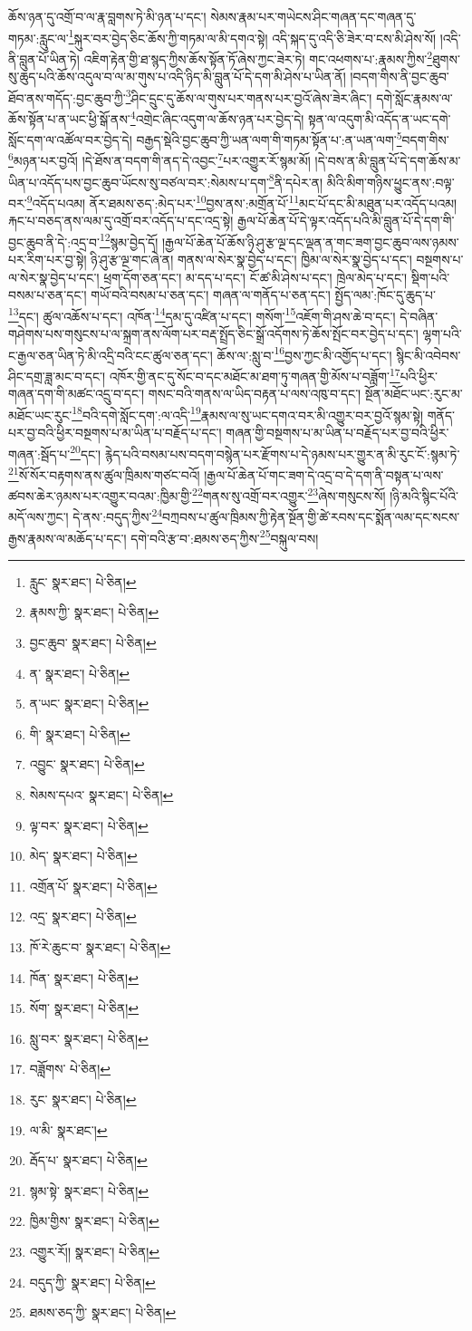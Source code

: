 ཆོས་ཉན་དུ་འགྲོ་བ་ལ་རྣ་བླགས་ཏེ་མི་ཉན་པ་དང་། སེམས་རྣམ་པར་གཡེངས་ཤིང་གཞན་དང་གཞན་དུ་གཏམ་:རླུང་ལ་\footnote{རླུང་  སྣར་ཐང་།  པེ་ཅིན། }སྐུར་བར་བྱེད་ཅིང་ཆོས་ཀྱི་གཏམ་ལ་མི་དགའ་སྟེ། འདི་སྐད་དུ་འདི་ཅི་ཟེར་བ་ངས་མི་ཤེས་སོ། །འདི་ནི་བླུན་པོ་ཡིན་ཏེ། འཇིག་རྟེན་གྱི་ཐ་སྙད་ཀྱིས་ཆོས་སྟོན་ཏོ་ཞེས་ཀྱང་ཟེར་ཏེ། གང་འཕགས་པ་:རྣམས་ཀྱིས་\footnote{རྣམས་ཀྱི་  སྣར་ཐང་།  པེ་ཅིན། }ཐུགས་སུ་ཆུད་པའི་ཆོས་འདུལ་བ་ལ་མ་གུས་པ་འདི་ཉིད་མི་བླུན་པོ་དེ་དག་མི་ཤེས་པ་ཡིན་ནོ། །བདག་གིས་ནི་བྱང་ཆུབ་ཐོབ་ནས་གདོད་:བྱང་ཆུབ་ཀྱི་\footnote{བྱང་ཆུབ་  སྣར་ཐང་།  པེ་ཅིན། }ཤིང་དྲུང་དུ་ཆོས་ལ་གུས་པར་གནས་པར་བྱའོ་ཞེས་ཟེར་ཞིང་། དགེ་སློང་རྣམས་ལ་ཆོས་སྟོན་པ་ན་ཡང་ཕྱི་སྒོ་ནས་\footnote{ན་  སྣར་ཐང་།  པེ་ཅིན། }འགྲེང་ཞིང་འདུག་ལ་ཆོས་ཉན་པར་བྱེད་དེ། སྟན་ལ་འདུག་མི་འདོད་ན་ཡང་དགེ་སློང་དག་ལ་འཚོལ་བར་བྱེད་དེ། བརྒྱད་སྡེའི་བྱང་ཆུབ་ཀྱི་ཡན་ལག་གི་གཏམ་སྟོན་པ་:ན་ཡན་ལག་\footnote{ན་ཡང་  སྣར་ཐང་།  པེ་ཅིན། }བདག་གིས་\footnote{གི་  སྣར་ཐང་།  པེ་ཅིན། }མཉན་པར་བྱའོ། །དེ་ཐོས་ན་བདག་གི་ནད་དེ་འབྱང་\footnote{འབྱུང་  སྣར་ཐང་།  པེ་ཅིན། }པར་འགྱུར་རོ་སྙམ་མོ། །དེ་བས་ན་མི་བླུན་པོ་དེ་དག་ཆོས་མ་ཡིན་པ་འདོད་པས་བྱང་ཆུབ་ཡོངས་སུ་བཙལ་བར་:སེམས་པ་དག་\footnote{སེམས་དཔའ་  སྣར་ཐང་།  པེ་ཅིན། }ནི་དཔེར་ན། མིའི་མིག་གཉིས་ཕྱུང་ནས་:བལྟ་བར་\footnote{ལྟ་བར་  སྣར་ཐང་།  པེ་ཅིན། }འདོད་པའམ། ནོར་ཐམས་ཅད་:མེད་པར་\footnote{མེད་  སྣར་ཐང་།  པེ་ཅིན། }བྱས་ནས་:མགྲོན་པོ་\footnote{འགྲོན་པོ་  སྣར་ཐང་།  པེ་ཅིན། }མང་པོ་དང་མི་མཐུན་པར་འདོད་པའམ། རྐང་པ་བཅད་ནས་ལམ་དུ་འགྲོ་བར་འདོད་པ་དང་འདྲ་སྟེ། རྒྱལ་པོ་ཆེན་པོ་དེ་ལྟར་འདོད་པའི་མི་བླུན་པོ་དེ་དག་གི་བྱང་ཆུབ་ནི་དེ་:འདྲ་བ་\footnote{འདྲ་  སྣར་ཐང་།  པེ་ཅིན། }སྙམ་བྱེད་དོ། །རྒྱལ་པོ་ཆེན་པོ་ཆོས་ཉི་ཤུ་རྩ་ལྔ་དང་ལྡན་ན་གང་ཟག་བྱང་ཆུབ་ལས་ཉམས་པར་རིག་པར་བྱ་སྟེ། ཉི་ཤུ་རྩ་ལྔ་གང་ཞེ་ན། གནས་ལ་སེར་སྣ་བྱེད་པ་དང་། ཁྱིམ་ལ་སེར་སྣ་བྱེད་པ་དང་། བསྔགས་པ་ལ་སེར་སྣ་བྱེད་པ་དང་། ཕྲག་དོག་ཅན་དང་། མ་དད་པ་དང་། ངོ་ཚ་མི་ཤེས་པ་དང་། ཁྲེལ་མེད་པ་དང་། སྡིག་པའི་བསམ་པ་ཅན་དང་། གཡོ་བའི་བསམ་པ་ཅན་དང་། གཞན་ལ་གནོད་པ་ཅན་དང་། སྤྱོད་ལམ་:ཁོང་དུ་ཆུད་པ་\footnote{ཁོ་རེ་ཆུང་བ་  སྣར་ཐང་།  པེ་ཅིན། }དང་། ཚུལ་འཆོས་པ་དང་། འཁོན་\footnote{ཁོན་  སྣར་ཐང་།  པེ་ཅིན། }དམ་དུ་འཛིན་པ་དང་། གསོག་\footnote{སོག་  སྣར་ཐང་།  པེ་ཅིན། }འཇོག་གི་ཤས་ཆེ་བ་དང་། དེ་བཞིན་གཤེགས་པས་གསུངས་པ་ལ་སྐྲག་ནས་ལོག་པར་བརྡ་སྤྲོད་ཅིང་སྒྲོ་འདོགས་ཏེ་ཆོས་སྤོང་བར་བྱེད་པ་དང་། ལྷག་པའི་ང་རྒྱལ་ཅན་ཡིན་ཏེ་མི་འདྲི་བའི་ངང་ཚུལ་ཅན་དང་། ཆོས་ལ་:སླུ་བ་\footnote{སླུ་བར་  སྣར་ཐང་།  པེ་ཅིན། }བྱས་ཀྱང་མི་འགྱོད་པ་དང་། སྙིང་མི་འབེབས་ཤིང་དགྲ་ཟླ་མང་བ་དང་། འཁོར་གྱི་ནང་དུ་སོང་བ་དང་མཐོང་མ་ཐག་ཏུ་གཞན་གྱི་མོས་པ་བཟློག་\footnote{བཟློགས་  པེ་ཅིན། }པའི་ཕྱིར་གཞན་དག་གི་མཚང་འདྲུ་བ་དང་། གསང་བའི་གནས་ལ་ཡིད་བརྟན་པ་ལས་འཁུ་བ་དང་། སྔོན་མཐོང་ཡང་:རུང་མ་མཐོང་ཡང་རུང་\footnote{རུང་  སྣར་ཐང་།  པེ་ཅིན། }བའི་དགེ་སློང་དག་:ལ་འདི་\footnote{ལ་མི་  སྣར་ཐང་། }རྣམས་ལ་སུ་ཡང་དགའ་བར་མི་འགྱུར་བར་བྱའོ་སྙམ་སྟེ། གནོད་པར་བྱ་བའི་ཕྱིར་བསྔགས་པ་མ་ཡིན་པ་བརྗོད་པ་དང་། གཞན་གྱི་བསྔགས་པ་མ་ཡིན་པ་བརྗོད་པར་བྱ་བའི་ཕྱིར་གཞན་:སྦོད་པ་\footnote{རྦོད་པ་  སྣར་ཐང་།  པེ་ཅིན། }དང་། རྙེད་པའི་བསམ་པས་བདག་བསྙེན་པར་རྫོགས་པ་དེ་ཉམས་པར་གྱུར་ན་མི་རུང་ངོ་:སྙམ་ཏེ་\footnote{སྙམ་སྟེ་  སྣར་ཐང་།  པེ་ཅིན། }སོ་སོར་བརྟགས་ནས་ཚུལ་ཁྲིམས་གཙང་བའོ། །རྒྱལ་པོ་ཆེན་པོ་གང་ཟག་དེ་འདྲ་བ་དེ་དག་ནི་བསྟན་པ་ལས་ཚབས་ཆེར་ཉམས་པར་འགྱུར་བའམ་:ཁྱིམ་གྱི་\footnote{ཁྱིམ་གྱིས་  སྣར་ཐང་།  པེ་ཅིན། }གནས་སུ་འགྲོ་བར་འགྱུར་\footnote{འགྱུར་རོ།།  སྣར་ཐང་།  པེ་ཅིན། }ཞེས་གསུངས་སོ། །ཉི་མའི་སྙིང་པོའི་མདོ་ལས་ཀྱང་། དེ་ནས་:བདུད་ཀྱིས་\footnote{བདུད་ཀྱི་  སྣར་ཐང་།  པེ་ཅིན། }བཀྲབས་པ་ཚུལ་ཁྲིམས་ཀྱི་རྟེན་སྔོན་གྱི་ཚེ་རབས་དང་སྨོན་ལམ་དང་སངས་རྒྱས་རྣམས་ལ་མཆོད་པ་དང་། དགེ་བའི་རྩ་བ་:ཐམས་ཅད་ཀྱིས་\footnote{ཐམས་ཅད་ཀྱི་  སྣར་ཐང་།  པེ་ཅིན། }བསྐུལ་བས། 
